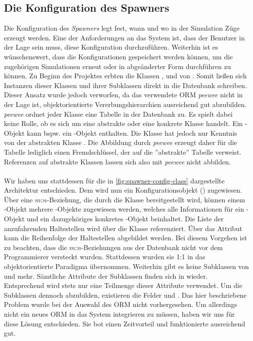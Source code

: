 \subsection{Die Konfiguration des Spawners}

Die Konfiguration des \emph{Spawners} legt fest, wann und wo in der Simulation Züge erzeugt werden. Eine der Anforderungen an das System ist, dass der Benutzer in der Lage sein muss, diese Konfiguration durchzuführen. Weiterhin ist es wünschenswert, dass die Konfigurationen gespeichert werden können, um die zugehörigen Simulationen erneut oder in abgeänderter Form durchführen zu können. Zu Beginn des Projektes erbten die Klassen ,  und  von . Somit ließen sich Instanzen dieser Klassen und ihrer Subklassen direkt in die Datenbank schreiben. Dieser Ansatz wurde jedoch verworfen, da das verwendete ORM \emph{peewee} nicht in der Lage ist, objektorientierte Vererbungshierarchien ausreichend gut abzubilden. \emph{peewee} ordnet jeder Klasse eine Tabelle in der Datenbank zu. Es spielt dabei keine Rolle, ob es sich um eine abstrakte oder eine konkrete Klasse handelt. Ein -Objekt kann bspw. ein -Objekt enthalten. Die Klasse  hat jedoch nur Kenntnis von der abstrakten Klasse . Die Abbildung durch \emph{peewee} erzeugt daher für die Tabelle  lediglich einen Fremdschlüssel, der auf die ''abstrakte'' Tabelle  verweist. Referenzen auf abstrakte Klassen lassen sich also mit \emph{peewee} nicht abbilden.\\
\\
Wir haben uns stattdessen für die in \autoref{fig:spawner-config-class} dargestellte Architektur entschieden. Dem  wird nun ein Konfigurationsobjekt () zugewiesen. Über eine $m$:$n$-Beziehung, die durch die Klasse  bereitgestellt wird, können einem -Objekt mehrere -Objekte zugewiesen werden, welches alle Informationen für ein -Objekt und ein dazugehöriges konkretes -Objekt beinhaltet. Die Liste der anzufahrenden Haltestellen wird über die Klasse  referenziert. Über das Attribut  kann die Reihenfolge der Haltestellen abgebildet werden. Bei diesem Vorgehen ist zu beachten, dass die $m$:$n$-Beziehungen aus der Datenbank nicht vor dem Programmierer versteckt wurden. Stattdessen wurden sie 1:1 in das objektorientierte Paradigma übernommen. Weiterhin gibt es keine Subklassen von  und  mehr. Sämtliche Attribute der Subklassen finden sich in  wieder. Entsprechend wird stets nur eine Teilmenge dieser Attribute verwendet. Um die Subklassen dennoch abzubilden, existieren die Felder  und . Das hier beschriebene Problem wurde bei der Auswahl des ORM nicht vorhergesehen. Um allerdings nicht ein neues ORM in das System integrieren zu müssen, haben wir uns für diese Lösung entschieden. Sie bot einen Zeitvorteil und funktionierte ausreichend gut.

